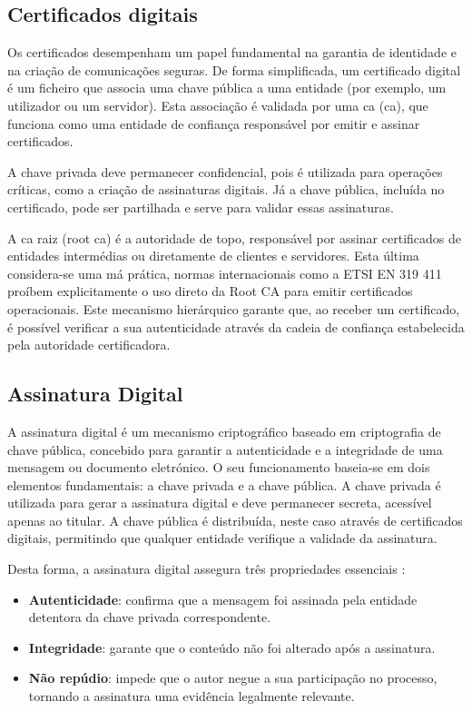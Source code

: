 \subsection{Certificados digitais}

Os certificados desempenham um papel fundamental na garantia de identidade e na criação de comunicações seguras. De forma simplificada, um certificado digital é um ficheiro que associa uma chave pública a uma entidade (por exemplo, um utilizador ou um servidor). Esta associação é validada por uma \acrlong{ca} (\acrshort{ca}), que funciona como uma entidade de confiança responsável por emitir e assinar certificados.

A chave privada deve permanecer confidencial, pois é utilizada para operações críticas, como a criação de assinaturas digitais. Já a chave pública, incluída no certificado, pode ser partilhada e serve para validar essas assinaturas.

A \acrshort{ca} raiz (root \acrshort{ca}) é a autoridade de topo, responsável por assinar certificados de entidades intermédias ou diretamente de clientes e servidores. Esta última considera-se uma má prática, normas internacionais como a ETSI EN 319 411 \citep{ETSI_EN_319_411_1} proíbem explicitamente o uso direto da Root CA para emitir certificados operacionais. Este mecanismo hierárquico garante que, ao receber um certificado, é possível verificar a sua autenticidade através da cadeia de confiança estabelecida pela autoridade certificadora.

\subsection{Assinatura Digital}

A assinatura digital é um mecanismo criptográfico baseado em criptografia de chave pública, concebido para garantir a autenticidade e a integridade de uma mensagem ou documento eletrónico. O seu funcionamento baseia-se em dois elementos fundamentais: a chave privada e a chave pública. A chave privada é utilizada para gerar a assinatura digital e deve permanecer secreta, acessível apenas ao titular. A chave pública é distribuída, neste caso através de certificados digitais, permitindo que qualquer entidade verifique a validade da assinatura.

Desta forma, a assinatura digital assegura três propriedades essenciais \citep{digitalsignatures}:
\begin{itemize}
    \item \textbf{Autenticidade}: confirma que a mensagem foi assinada pela entidade detentora da chave privada correspondente.
    \item \textbf{Integridade}: garante que o conteúdo não foi alterado após a assinatura.
    \item \textbf{Não repúdio}: impede que o autor negue a sua participação no processo, tornando a assinatura uma evidência legalmente relevante.
\end{itemize}

